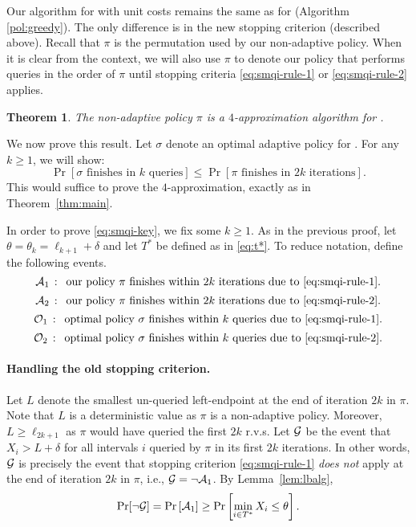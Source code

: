 \documentclass[11pt]{article}
\newtheorem{thm}{Theorem}[section]
\theoremstyle{remark}
\theoremstyle{plain}
\theoremstyle{remark}
\begin{document}
Our algorithm for \smqi with unit costs remains the same as for \smq (Algorithm \ref{pol:greedy}). The only difference is in the new stopping criterion (described above). Recall that $\pi$ is the permutation used by our non-adaptive policy. When it is clear from the context, we will also use $\pi$ to denote our \smqi policy that performs queries in the order of $\pi$ until   stopping criteria \eqref{eq:smqi-rule-1} or \eqref{eq:smqi-rule-2} applies. 

 
\def\cG{{\cal G}}
 \def\cE{{\cal E}}
 
\def\cA{{\cal A}}
 \def\cO{{\cal O}}
 
\begin{thm}\label{thm:smqi-unit}
    The non-adaptive policy $\pi$ is a $4$-approximation algorithm for \smqi.
\end{thm}

We now prove this result. Let $\sigma$ denote an optimal adaptive policy for \smqi. For any $k\ge 1$, we will show:
\begin{equation}
\Pr[\sigma\text{ finishes in }k \text{ queries}]  \leq \Pr[\pi \text{ finishes in 2}k \text{ iterations}].  \label{eq:smqi-key} 
\end{equation}
This would suffice to prove the $4$-approximation, exactly as in Theorem~\ref{thm:main}. 

In order to prove \eqref{eq:smqi-key},  we fix some $k\ge 1$. As in the previous proof, let $\theta=\theta_k=\ell_{k+1}+\delta$ and let $T^*$ be defined as in \eqref{eq:t*}. To reduce notation, define the following events. 
$$ \cA_1 \,:\, \text{    our policy $\pi$   finishes within $2k$ iterations due to~\eqref{eq:smqi-rule-1}.}$$
$$ \cA_2 \,:\, \text{    our policy $\pi$   finishes within $2k$ iterations due to~\eqref{eq:smqi-rule-2}.}$$
$$ \cO_1 \,:\, \text{    optimal policy $\sigma$   finishes within $k$ queries due to~\eqref{eq:smqi-rule-1}.}$$
$$ \cO_2 \,:\, \text{    optimal policy $\sigma$   finishes within $k$ queries due to~\eqref{eq:smqi-rule-2}.}$$


\paragraph{Handling the old stopping criterion.}
Let $L$ denote the smallest un-queried left-endpoint at the end of iteration $2k$ in $\pi$.  Note that $L$ is a deterministic value as $\pi$ is a non-adaptive policy. Moreover, $L\ge \ell_{2k+1}$ as $\pi$ would have queried the first $2k$ r.v.s. Let 
$\cG$ be the event that $X_i>L+\delta$ for all intervals $i$  queried by $\pi$ in its first $2k$ iterations. In other words, $\cG$ is precisely the event that stopping criterion \eqref{eq:smqi-rule-1} {\em does not} apply at the end of iteration $2k$ in $\pi$, i.e., $\cG=\neg \cA_1$. By Lemma~\ref{lem:lbalg}, 
\begin{equation*}
\Pr[\neg \cG] =    \Pr\left[\cA_1\right] \ge \Pr\left[\min_{i \in T^*} X_i  \le  \theta\right] .
\end{equation*}
\end{document}
